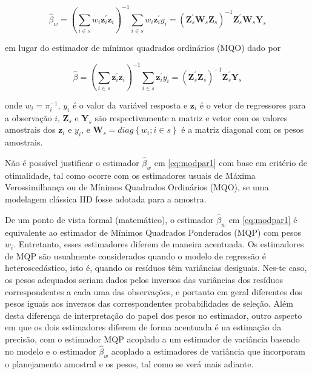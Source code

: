 \documentclass[]{book}
\numberwithin{example}{chapter}
\numberwithin{remark}{chapter}
\numberwithin{definition}{chapter}
\begin{document}
\begin{equation}
\widehat{\beta }_{w}=\left(\sum_{i\in s}w_{i}\mathbf{z}_{i}^{\prime }
\mathbf{z}_{i}\right) ^{-1}\sum_{i\in s}w_{i}\mathbf{z}_{i}^{\prime}y_{i}=
\left(\mathbf{Z}_{s}^{\prime }\mathbf{W}_{s}\mathbf{Z}_{s}\right)^{-1}\mathbf{Z}_{s}^{\prime }\mathbf{W}_{s}\mathbf{Y}_{s} 
\label{eq:modpar1}
\end{equation}

em lugar do estimador de mínimos quadrados ordinários (MQO) dado por

\begin{equation}
\widehat{\beta}=\left( \sum_{i\in s}\mathbf{z}_{i}^{\prime }\mathbf{z}_{i}\right)^{-1}\sum_{i\in s}\mathbf{z}_{i}^{\prime }y_{i}=\left(\mathbf{Z}_{s}^{\prime }\mathbf{Z}_{s}\right)^{-1}\mathbf{Z}_{s}^{\prime }\mathbf{Y}_{s}  
\label{eq:modpar2}
\end{equation}

onde \(w_{i}=\pi _{i}^{-1}\), \(y_{i}\) é o valor da variável resposta e
\(\mathbf{z}_{i}\) é o vetor de regressores para a observação \(i\),
\(\mathbf{Z}_{s}\) e \(\mathbf{Y}_{s}\) são respectivamente a matriz e
vetor com os valores amostrais dos \(\mathbf{z}_{i}\) e \(y_{i}\), e
\(\mathbf{W}_{s}=diag\left\{ w_{i};i\in s\right\}\) é a matriz diagonal
com os pesos amostrais.

Não é possível justificar o estimador \(\widehat{\beta }_{w}\) em
\eqref{eq:modpar1} com base em critério de otimalidade, tal como ocorre
com os estimadores usuais de Máxima Verossimilhança ou de Mínimos
Quadrados Ordinários (MQO), se uma modelagem clássica IID fosse adotada
para a amostra.

De um ponto de vista formal (matemático), o estimador
\(\widehat{\beta }_{w}\) em \eqref{eq:modpar1} é equivalente ao estimador
de Mínimos Quadrados Ponderados (MQP) com pesos \(w_{i}\). Entretanto,
esses estimadores diferem de maneira acentuada. Os estimadores de MQP
são usualmente considerados quando o modelo de regressão é
heteroscedástico, isto é, quando os resíduos têm variâncias desiguais.
Nes-te caso, os pesos adequados seriam dados pelos inversos das
variâncias dos resíduos correspondentes a cada uma das observações, e
portanto em geral diferentes dos pesos iguais aos inversos das
correspondentes probabilidades de seleção. Além desta diferença de
interpretação do papel dos pesos no estimador, outro aspecto em que os
dois estimadores diferem de forma acentuada é na estimação da precisão,
com o estimador MQP acoplado a um estimador de variância baseado no
modelo e o estimador \(\widehat{\beta }_{w}\) acoplado a estimadores de
variância que incorporam o planejamento amostral e os pesos, tal como se
verá mais adiante.
\end{document}
